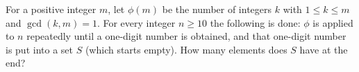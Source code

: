 For a positive integer $m$, let $\phi(m)$ be the number of integers $k$ with $1\le k\le m$ and $\gcd(k,m)=1$. For every integer $n\ge10$ the following is done: $\phi$ is applied to $n$ repeatedly until a one-digit number is obtained, and that one-digit number is put into a set $S$ (which starts empty). How many elements does $S$ have at the end?
